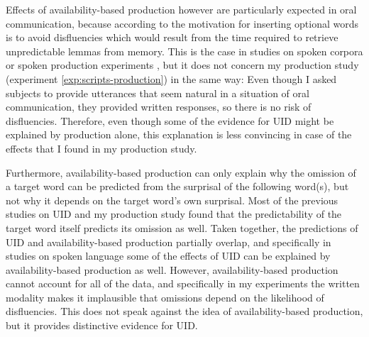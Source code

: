 Effects of availability-based production however are particularly expected in oral communication, because according to \citet{ferreira.dell2000} the motivation for inserting optional words is to avoid disfluencies which would result from the time required to retrieve unpredictable lemmas from memory. This is the case in studies on spoken corpora \citep{levy.jaeger2007, frank.jaeger2008, jaeger2010} or spoken production experiments \citep{kurumada.jaeger2015, norcliffe.jaeger2016}, but it does not concern my production study (experiment \ref{exp:scripts-production}) in the same way: Even though I asked subjects to provide utterances that seem natural in a situation of oral communication, they provided written responses, so there is no risk of disfluencies. Therefore, even though some of the evidence for UID might be explained by production alone, this explanation is less convincing in case of the effects that I found in my production study.

Furthermore, availability-based production can only explain why the omission of a target word can be predicted from the surprisal of the following word(s), but not why it depends on the target word's own surprisal. Most of the previous studies on UID and my production study found that the predictability of the target word itself predicts its omission as well. Taken together, the predictions of UID and availability-based production partially overlap, and specifically in studies on spoken language some of the effects of UID can be explained by availability-based production as well. However, availability-based production cannot account for all of the data, and specifically in my experiments the written modality makes it implausible that omissions depend on the likelihood of disfluencies. This does not speak against the idea of availability-based production, but it provides distinctive evidence for UID.

